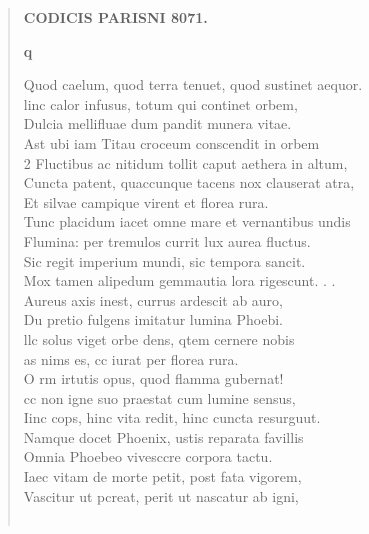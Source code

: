 \documentclass[11pt, a4paper]{report}
\begin{document}
\begin{verse}
    \begin{center} \textbf{CODICIS PARISNI 8071.} \end{center}\begin{center} \textbf{q} \end{center}Quod caelum, quod terra tenuet, quod sustinet aequor. \\ linc calor infusus, totum qui continet orbem, \\ Dulcia mellifluae dum pandit munera vitae. \\ Ast ubi iam Titau croceum conscendit in orbem \\ 2 Fluctibus ac nitidum tollit caput aethera in altum, \\ Cuncta patent, quaccunque tacens nox clauserat atra, \\ Et silvae campique virent et florea rura. \\ Tunc placidum iacet omne mare et vernantibus undis \\ Flumina: per tremulos currit lux aurea fluctus. \\ Sic regit imperium mundi, sic tempora sancit. \\ Mox tamen alipedum gemmautia lora rigescunt. . . \\ Aureus axis inest, currus ardescit ab auro, \\ Du pretio fulgens imitatur lumina Phoebi. \\ llc solus viget orbe dens, qtem cernere nobis \\ as nims es, cc iurat per florea rura. \\ O rm irtutis opus, quod flamma gubernat! \\ cc non igne suo praestat cum lumine sensus, \\ Iinc cops, hinc vita redit, hinc cuncta resurguut. \\ Namque docet Phoenix, ustis reparata favillis \\ Omnia Phoebeo vivesccre corpora tactu. \\ Iaec vitam de morte petit, post fata vigorem, \\ Vascitur ut pcreat, perit ut nascatur ab igni, \\ 
        ﻿\pagebreak 

\end{verse}
\end{document}
